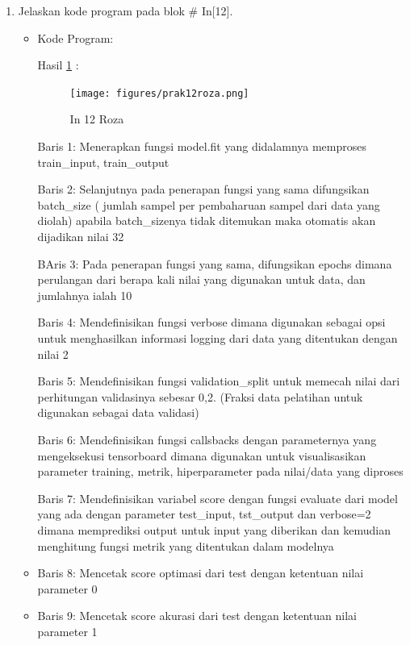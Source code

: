 \begin{enumerate}
\item Jelaskan kode program pada blok \# In[12].
\begin{itemize}
\item Kode Program:

\par Hasil \ref{in12roza} :
\begin{figure}[!hbtp]
\centering
\texttt{[image: figures/prak12roza.png]}
\caption{In 12 Roza}
\label{in12roza}
\end{figure}
\par Baris 1: Menerapkan fungsi model.fit yang didalamnya memproses train\_input, train\_output
\par Baris 2: Selanjutnya pada penerapan fungsi yang sama difungsikan batch\_size ( jumlah sampel per pembaharuan sampel dari data yang diolah) apabila batch\_sizenya tidak ditemukan maka otomatis akan dijadikan nilai 32	
\par BAris 3: Pada penerapan fungsi yang sama, difungsikan epochs dimana perulangan dari berapa kali nilai yang digunakan untuk data, dan jumlahnya ialah 10
\par Baris 4: Mendefinisikan fungsi verbose dimana digunakan sebagai opsi untuk menghasilkan informasi logging dari data yang ditentukan dengan nilai 2
\par Baris 5: Mendefinisikan fungsi validation\_split untuk memecah nilai dari perhitungan validasinya sebesar 0,2. (Fraksi data pelatihan untuk digunakan sebagai data validasi)
\par Baris 6: Mendefinisikan fungsi callsbacks dengan parameternya yang mengeksekusi tensorboard dimana digunakan untuk visualisasikan parameter training, metrik, hiperparameter pada nilai/data yang diproses
\par Baris 7: Mendefinisikan variabel score dengan fungsi evaluate dari model yang ada dengan parameter test\_input, tst\_output dan verbose=2 dimana memprediksi output untuk input yang diberikan dan kemudian menghitung fungsi metrik yang ditentukan dalam modelnya
\item Baris 8: Mencetak score optimasi dari test dengan ketentuan nilai parameter 0
\item Baris 9: Mencetak score akurasi dari test dengan ketentuan nilai parameter 1
\end{itemize}
\par


\end{enumerate}
